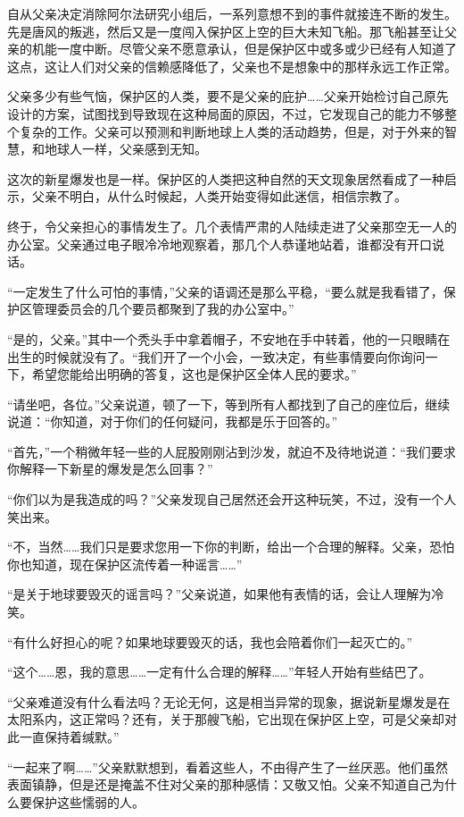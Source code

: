 自从父亲决定消除阿尔法研究小组后，一系列意想不到的事件就接连不断的发生。先是唐风的叛逃，然后又是一度闯入保护区上空的巨大未知飞船。那飞船甚至让父亲的机能一度中断。尽管父亲不愿意承认，但是保护区中或多或少已经有人知道了这点，这让人们对父亲的信赖感降低了，父亲也不是想象中的那样永远工作正常。

父亲多少有些气恼，保护区的人类，要不是父亲的庇护……父亲开始检讨自己原先设计的方案，试图找到导致现在这种局面的原因，不过，它发现自己的能力不够整个复杂的工作。父亲可以预测和判断地球上人类的活动趋势，但是，对于外来的智慧，和地球人一样，父亲感到无知。

这次的新星爆发也是一样。保护区的人类把这种自然的天文现象居然看成了一种启示，父亲不明白，从什么时候起，人类开始变得如此迷信，相信宗教了。

终于，令父亲担心的事情发生了。几个表情严肃的人陆续走进了父亲那空无一人的办公室。父亲通过电子眼冷冷地观察着，那几个人恭谨地站着，谁都没有开口说话。

“一定发生了什么可怕的事情，”父亲的语调还是那么平稳，“要么就是我看错了，保护区管理委员会的几个要员都聚到了我的办公室中。”

“是的，父亲。”其中一个秃头手中拿着帽子，不安地在手中转着，他的一只眼睛在出生的时候就没有了。“我们开了一个小会，一致决定，有些事情要向你询问一下，希望您能给出明确的答复，这也是保护区全体人民的要求。”

“请坐吧，各位。”父亲说道，顿了一下，等到所有人都找到了自己的座位后，继续说道：“你知道，对于你们的任何疑问，我都是乐于回答的。”

“首先，”一个稍微年轻一些的人屁股刚刚沾到沙发，就迫不及待地说道：“我们要求你解释一下新星的爆发是怎么回事？”

“你们以为是我造成的吗？”父亲发现自己居然还会开这种玩笑，不过，没有一个人笑出来。

“不，当然……我们只是要求您用一下你的判断，给出一个合理的解释。父亲，恐怕你也知道，现在保护区流传着一种谣言……”

“是关于地球要毁灭的谣言吗？”父亲说道，如果他有表情的话，会让人理解为冷笑。

“有什么好担心的呢？如果地球要毁灭的话，我也会陪着你们一起灭亡的。”

“这个……恩，我的意思……一定有什么合理的解释……”年轻人开始有些结巴了。

“父亲难道没有什么看法吗？无论无何，这是相当异常的现象，据说新星爆发是在太阳系内，这正常吗？还有，关于那艘飞船，它出现在保护区上空，可是父亲却对此一直保持着缄默。”

“一起来了啊……”父亲默默想到，看着这些人，不由得产生了一丝厌恶。他们虽然表面镇静，但是还是掩盖不住对父亲的那种感情：又敬又怕。父亲不知道自己为什么要保护这些懦弱的人。

